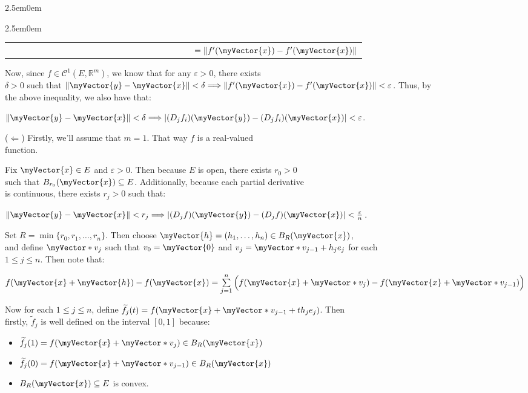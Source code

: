 \documentclass{book}
\newenvironment{myIndent}{%
   \begin{adjustwidth}{2.5em}{0em}%
}{%
   \end{adjustwidth}%
}
\newcommand{\retTwo}{\hfill\bigbreak}
\newcommand{\myVS}{\vphantom{\ensuremath{\int_a^b}}}
\newcommand{\mVec}[1]{\myVector{#1}}
\newcommand{\mVecAst}[1]{\myVector*{#1}}
\begin{document}
{\begin{myIndent}
{\begin{myIndent}
\begin{center}
\begin{tabular}{l}
            $\phantom{|(D_jf_i)(\mVec{y}) - (D_jf_i)(\mVec{x})|} = \|f^\prime(\mVec{x}) - f^\prime(\mVec{x})\|$
         \end{tabular}\retTwo
      \end{center}

      Now, since $f \in \mathscr{C}^1(E, \mathbb{R}^m)$, we know that for any $\varepsilon > 0$, there exists\\ $\delta > 0$ such that $\|\mVec{y} - \mVec{x}\| < \delta \Longrightarrow \|f^\prime(\mVec{x}) - f^\prime(\mVec{x})\| < \varepsilon$. Thus, by\\ the above inequality, we also have that:
      
      {\centering $\|\mVec{y} - \mVec{x}\| < \delta \Longrightarrow |(D_jf_i)(\mVec{y}) - (D_jf_i)(\mVec{x})| < \varepsilon$.\retTwo\par}

      ($\Longleftarrow$) Firstly, we'll assume that $m = 1$. That way $f$ is a real-valued\\ function.\retTwo

      Fix $\mVec{x} \in E$ and $\varepsilon > 0$. Then because $E$ is open, there exists $r_0 > 0$\\ such that $B_{r_0}(\mVec{x}) \subseteq E$. Additionally, because each partial derivative\\ is continuous, there exists $r_j > 0$ such that:
      
      {\centering $\|\mVec{y} - \mVec{x}\| < r_j \Longrightarrow |(D_jf)(\mVec{y}) - (D_jf)(\mVec{x})| < \frac{\varepsilon}{n}$.\retTwo\par}

      Set $R = \min\{r_0, r_1, \ldots, r_n\}$. Then choose $\mVec{h} = (h_1, \ldots, h_n) \in B_R(\mVec{x})$,\\ and define $\mVecAst{v}_j$ such that $v_0 = \mVec{0}$ and $v_j = \mVecAst{v}_{j-1} + h_je_j$ for each\\ $1 \leq j \leq n$. Then note that: 
      \begin{center}
         {\fontsize{12}{14}\selectfont
            $f(\mVec{x} + \mVec{h}) - f(\mVec{x}) = \sum\limits_{j=1}^n\left(\myVS f(\mVec{x} + \mVecAst{v}_j) - f(\mVec{x} + \mVecAst{v}_{j-1})\right)$
         \retTwo}
      \end{center}

      Now for each $1 \leq j \leq n$, define $\widetilde{f}_j(t) = f(\mVec{x} + \mVecAst{v}_{j-1} + th_je_j)$. Then\\ firstly, $\widetilde{f}_j$ is well defined on the interval $[0, 1]$ because:
      \begin{itemize}
         \item $\widetilde{f}_j(1) = f(\mVec{x} + \mVecAst{v}_j) \in B_R(\mVec{x})$
         \item $\widetilde{f}_j(0) = f(\mVec{x} + \mVecAst{v}_{j-1}) \in B_R(\mVec{x})$
         \item $B_R(\mVec{x}) \subseteq E$ is convex.
      \end{itemize}\retTwo


\end{myIndent}}
\end{myIndent}}
\end{document}
